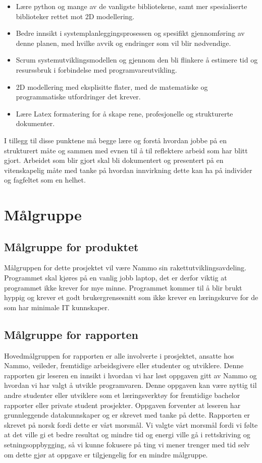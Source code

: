 \begin{itemize}

   \item    Lære python og mange av de vanligste bibliotekene, samt mer spesialiserte biblioteker rettet mot 2D modellering.
   
   \item    Bedre innsikt i systemplanleggingsprosessen og spesifikt gjennomføring av denne planen, med hvilke avvik og endringer som vil blir nødvendige.
   
   \item    Scrum systemutviklingsmodellen og gjennom den bli flinkere å estimere tid og resurssbruk i forbindelse med programvareutvikling.
   
   \item    2D modellering med eksplisitte flater, med de matematiske og programmatiske utfordringer det krever.
   
   \item    Lære Latex formatering for å skape rene, profesjonelle og strukturerte dokumenter.
   
\end{itemize}
I tillegg til disse punktene må begge lære og forstå  hvordan jobbe på en strukturert måte og sammen med evnen til å til reflektere arbeid som har blitt gjort. Arbeidet som blir gjort skal bli dokumentert og presentert på en vitenskapelig måte med tanke på hvordan innvirkning dette kan ha på individer og fagfeltet som en helhet.

\section{Målgruppe}
\subsection{Målgruppe for produktet}
Målgruppen for dette prosjektet vil være Nammo sin rakettutviklingsavdeling. Programmet skal kjøres på en vanlig jobb laptop, det er derfor viktig at programmet ikke krever for mye minne.
Programmet kommer til å blir brukt hyppig og krever et godt brukergrensesnitt som ikke krever en læringskurve for de som har minimale IT kunnskaper.


\subsection{Målgruppe for rapporten}
Hovedmålgruppen for rapporten er alle involverte i prosjektet, ansatte hos Nammo, veileder,  fremtidige arbeidsgivere eller studenter og utviklere. Denne rapporten gir leseren en innsikt i hvordan vi har løst oppgaven gitt av Nammo og hvordan vi har valgt å utvikle programvaren. Denne oppgaven kan være nyttig til andre studenter eller utviklere som et læringsverktøy for fremtidige bachelor rapporter eller private student prosjekter. Oppgaven forventer at leseren har grunnleggende datakunnskaper og er skrevet med tanke på dette. Rapporten er skrevet på norsk fordi dette er vårt morsmål. Vi valgte vårt morsmål fordi vi følte at det ville gi et bedre resultat og mindre tid og energi ville gå i rettskriving og setningsoppbygging, så vi kunne fokusere på ting vi mener trenger med tid selv om dette gjør at oppgave er tilgjengelig for en mindre målgruppe.
\clearpage
